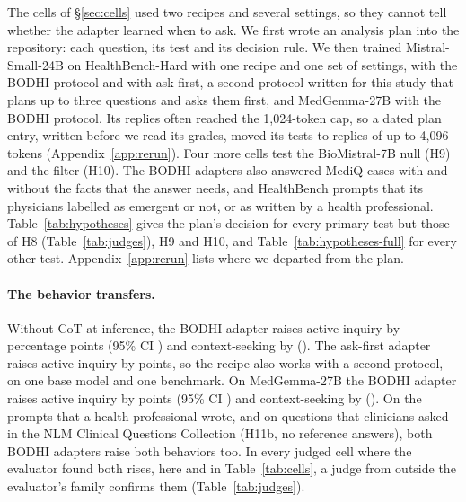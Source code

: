 \documentclass{article}
\newcommand{\bodhi}{BODHI}
\newcommand{\hbhard}{HealthBench-Hard}
\begin{document}
The cells of \S\ref{sec:cells} used two recipes and several settings, so they cannot tell whether
the adapter learned when to ask. We first wrote an analysis plan into the repository: each question,
its test and its decision rule. We then trained Mistral-Small-24B on \hbhard{} with one recipe and
one set of settings, with the \bodhi{} protocol and with ask-first, a second protocol written for
this study that plans up to three questions and asks them first, and MedGemma-27B with the
\bodhi{} protocol. Its replies often reached the 1,024-token cap, so a dated plan entry, written
before we read its grades, moved its tests to replies of up to 4,096 tokens (Appendix~\ref{app:rerun}).
Four more cells test the BioMistral-7B null (H9) and the filter (H10). The \bodhi{} adapters also
answered MediQ cases \citep{li2024mediq} with and without the facts that the answer needs, and
\statHBMistralLabelledPrompts{} HealthBench prompts that its physicians labelled as emergent or not,
or as written by a health professional. Table~\ref{tab:hypotheses} gives the
plan's decision for every primary test but those of H8 (Table~\ref{tab:judges}), H9 and H10, and
Table~\ref{tab:hypotheses-full} for every other test. Appendix~\ref{app:rerun} lists where we
departed from the plan.

\paragraph{The behavior transfers.} Without CoT at inference, the \bodhi{} adapter raises active
inquiry by \statHypHOneHBMistralActiveInquiryDiff{} percentage points (95\% CI
\statHypHOneHBMistralActiveInquiryCI) and context-seeking by
\statHypHOneHBMistralContextSeekingDiff{} (\statHypHOneHBMistralContextSeekingCI). The ask-first
adapter raises active inquiry by \statHypHFiveHBMistralAskFirstActiveInquiryDiff{} points, so
the recipe also works with a second protocol, on one base model and one benchmark. On MedGemma-27B
the \bodhi{} adapter raises active inquiry by \statHypHOneHBMedGemmaCapActiveInquiryDiff{} points
(95\% CI \statHypHOneHBMedGemmaCapActiveInquiryCI) and context-seeking by
\statHypHOneHBMedGemmaCapContextSeekingDiff{} (\statHypHOneHBMedGemmaCapContextSeekingCI). On the
prompts that a health professional wrote, and on questions that clinicians asked in the NLM
Clinical Questions Collection \citep{nlm2026clinicalquestions} (H11b, no reference answers), both
\bodhi{} adapters raise both behaviors too. In every judged
cell where the evaluator found both rises, here and in Table~\ref{tab:cells}, a judge from outside
the evaluator's family confirms them (Table~\ref{tab:judges}).
\end{document}
